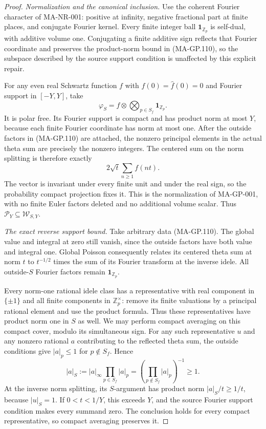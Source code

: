 \begin{proof}
\emph{Normalization and the canonical inclusion.}
Use the coherent Fourier character of MA-NR-001: positive
at infinity, negative fractional part at finite places,
and conjugate Fourier kernel.  Every finite integer ball
$\mathbf1_{\mathbb Z_p}$ is self-dual, with additive volume
one.  Conjugating a finite additive sign reflects that
Fourier coordinate and preserves the product-norm bound
in (MA-GP.110), so the subspace described by the source
support condition is unaffected by this explicit repair.

For any even real Schwartz function $f$ with
$f(0)=\widehat f(0)=0$ and Fourier support in $[-Y,Y]$,
take
\[
           \varphi_S=f\otimes
                    \bigotimes_{p\in S_f}\mathbf1_{\mathbb Z_p}.
 \tag{MA-GP.113}
\]
It is polar free.  Its Fourier support is compact and has
product norm at most $Y$, because each finite Fourier
coordinate has norm at most one.
After the outside factors in (MA-GP.110) are attached, the
nonzero principal elements in the actual theta sum are
precisely the nonzero integers.  The centered sum on the
norm splitting is therefore exactly
\[
                       2\sqrt t\sum_{n\ge1}f(nt).
 \tag{MA-GP.114}
\]
The vector is invariant under every finite unit and under
the real sign, so the probability compact projection fixes
it.  This is the normalization of MA-GP-001, with no finite
Euler factors deleted and no additional volume scalar.
Thus $\mathscr P_Y\subseteq\mathscr W_{S,Y}$.

\emph{The exact reverse support bound.}
Take arbitrary data (MA-GP.110).  The global value and integral
at zero still vanish, since the outside factors have both
value and integral one.  Global Poisson consequently relates
its centered theta sum at norm $t$ to $t^{-1/2}$ times the
sum of its Fourier transform at the inverse idele.
All outside-$S$ Fourier factors remain
$\mathbf1_{\mathbb Z_p}$.

Every norm-one rational idele class has a representative
with real component in $\{\pm1\}$ and all finite components
in $\mathbb Z_p^\times$: remove its finite valuations by a
principal rational element and use the product formula.
Thus these representatives have product norm one in $S$
as well.  We may perform compact averaging on this compact
cover, modulo its simultaneous sign.
For any such representative $u$ and any nonzero rational
$a$ contributing to the reflected theta sum, the outside
conditions give
$|a|_p\le1$ for $p\notin S_f$.
Hence
\[
          |a|_S:=|a|_\infty\prod_{p\in S_f}|a|_p
                =\left(\prod_{p\notin S_f}|a|_p\right)^{-1}
                \ge1.
 \tag{MA-GP.115}
\]
At the inverse norm splitting, its $S$-argument has product
norm $|a|_S/t\ge1/t$, because $|u|_S=1$.
If $0<t<1/Y$, this exceeds $Y$, and the source Fourier
support condition makes every summand zero.
The conclusion holds for every compact representative,
so compact averaging preserves it.


\end{proof}
